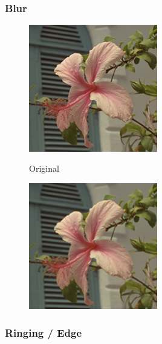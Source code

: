 {\newpage
\subsubsection{Blur}

\begin{figure}[h]
\begin{center}
       \includegraphics[width=0.5\textwidth]{imagenes/img3_blur_original.png}
        \caption{Original}
        \end{center}
\endminipage
{}
\begin{center}
       \includegraphics[width=0.5\textwidth]{imagenes/img3_blur.png}
        \caption{}
         \end{center}
\endminipage
\end{figure}


\subsubsection{Ringing / Edge}

}
